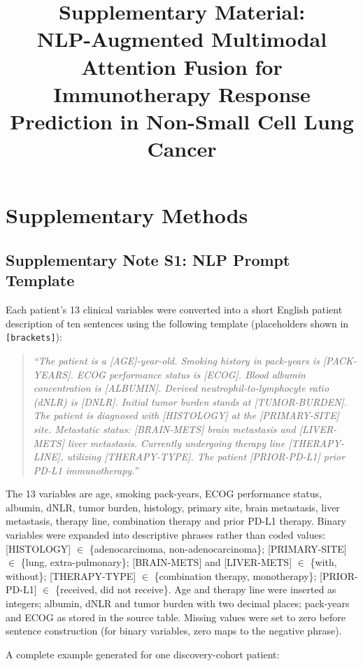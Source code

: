 \documentclass[12pt]{article}
\title{Supplementary Material:\\
NLP-Augmented Multimodal Attention Fusion for Immunotherapy Response
Prediction in Non-Small Cell Lung Cancer}
\author{}
\date{}
\begin{document}
\maketitle

\section{Supplementary Methods}

\subsection*{Supplementary Note S1: NLP Prompt Template}
\label{supp:note1}

Each patient's 13 clinical variables were converted into a short English
patient description of ten sentences using the following template
(placeholders shown in \texttt{[brackets]}):

\begin{quote}
\small
\raggedright
\textit{``The patient is a [AGE]-year-old. Smoking history in pack-years is
[PACK-YEARS]. ECOG performance status is [ECOG]. Blood albumin concentration
is [ALBUMIN]. Derived neutrophil-to-lymphocyte ratio (dNLR) is [DNLR].
Initial tumor burden stands at [TUMOR-BURDEN]. The patient is diagnosed with
[HISTOLOGY] at the [PRIMARY-SITE] site. Metastatic status: [BRAIN-METS] brain
metastasis and [LIVER-METS] liver metastasis. Currently undergoing therapy
line [THERAPY-LINE], utilizing [THERAPY-TYPE]. The patient [PRIOR-PD-L1]
prior PD-L1 immunotherapy.''}
\end{quote}

The 13 variables are age, smoking pack-years, ECOG performance status,
albumin, dNLR, tumor burden, histology, primary site, brain metastasis,
liver metastasis, therapy line, combination therapy and prior PD-L1 therapy.
Binary variables were expanded into descriptive phrases rather than coded
values: [HISTOLOGY] $\in$ \{adenocarcinoma, non-adenocarcinoma\};
[PRIMARY-SITE] $\in$ \{lung, extra-pulmonary\}; [BRAIN-METS] and
[LIVER-METS] $\in$ \{with, without\}; [THERAPY-TYPE] $\in$
\{combination therapy, monotherapy\}; [PRIOR-PD-L1] $\in$
\{received, did not receive\}.
Age and therapy line were inserted as integers; albumin, dNLR and tumor
burden with two decimal places; pack-years and ECOG as stored in the
source table. Missing values were set to zero before sentence construction
(for binary variables, zero maps to the negative phrase).

A complete example generated for one discovery-cohort patient:
\end{document}
